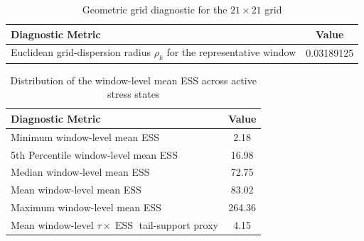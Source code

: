 \documentclass[smallextended]{svjour3}
\begin{document}
\begin{table}[htbp]
\centering
\caption{Computational benchmark: adaptive exchange algorithm vs. dense grid approximation}
\label{tab:computational}
\end{table}

\begin{table}[htbp]
\centering
\caption{Geometric grid diagnostic for the $21\times21$ grid}
\label{tab:grid_bounds}
\begin{tabular}{lc}
\toprule
\textbf{Diagnostic Metric} & \textbf{Value} \\
\midrule
Euclidean grid-dispersion radius $\rho_k$ for the representative window & 0.03189125 \\
\bottomrule
\end{tabular}
\end{table}

\begin{table}[htbp]
\centering
\caption{Distribution of the window-level mean ESS across active stress states}
\label{tab:ess_diagnostics}
\begin{tabular}{lc}
\toprule
\textbf{Diagnostic Metric} & \textbf{Value} \\
\midrule
Minimum window-level mean ESS & 2.18 \\
5th Percentile window-level mean ESS & 16.98 \\
Median window-level mean ESS & 72.75 \\
Mean window-level mean ESS & 83.02 \\
Maximum window-level mean ESS & 264.36 \\
Mean window-level $\tau\times \operatorname{ESS}$ tail-support proxy & 4.15 \\
\bottomrule
\end{tabular}
\end{table}
\end{document}
